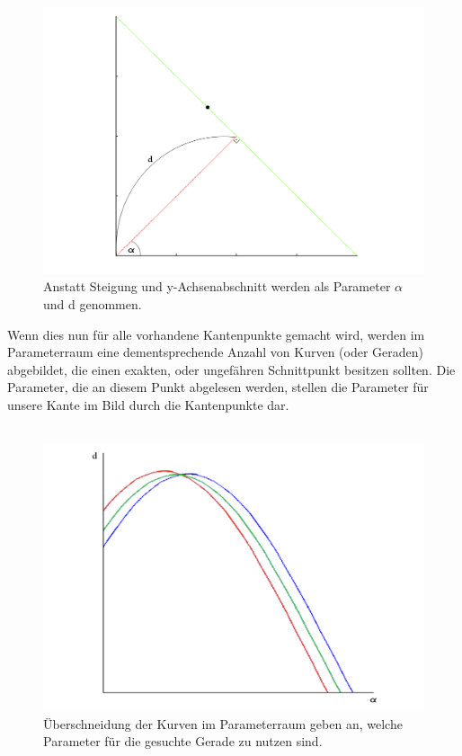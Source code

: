 \documentclass[12pt,a4paper,ngerman]{scrartcl}
\begin{document}
\begin{figure}[H]
  \centering
      \includegraphics[scale=1.1]{img/Hough1.png}
  \caption{Anstatt Steigung und y-Achsenabschnitt werden als Parameter $\alpha$ und d genommen.}
\end{figure}
Wenn dies nun für alle vorhandene Kantenpunkte gemacht wird, werden im Parameterraum eine dementsprechende Anzahl von Kurven (oder Geraden) abgebildet, die einen exakten, oder ungefähren Schnittpunkt besitzen sollten. Die Parameter, die an diesem Punkt abgelesen werden, stellen die Parameter für unsere Kante im Bild durch die Kantenpunkte dar.\\\\
\begin{figure}[H]
  \centering
      \includegraphics[scale=1.1]{img/Hough2.png}
  \caption{Überschneidung der Kurven im Parameterraum geben an, welche Parameter für die gesuchte Gerade zu nutzen sind.}
\end{figure}
\end{document}
